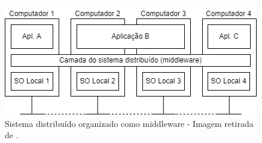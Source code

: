     \begin{figure}[h]
            \centering
            \includegraphics[scale=0.6]{figuras/sistema-distribuido.png}
            \caption{Sistema distribuído organizado como middleware - Imagem retirada de \cite{}.}
            \label{fig:sistema-distribuido}
    \end{figure}



    
